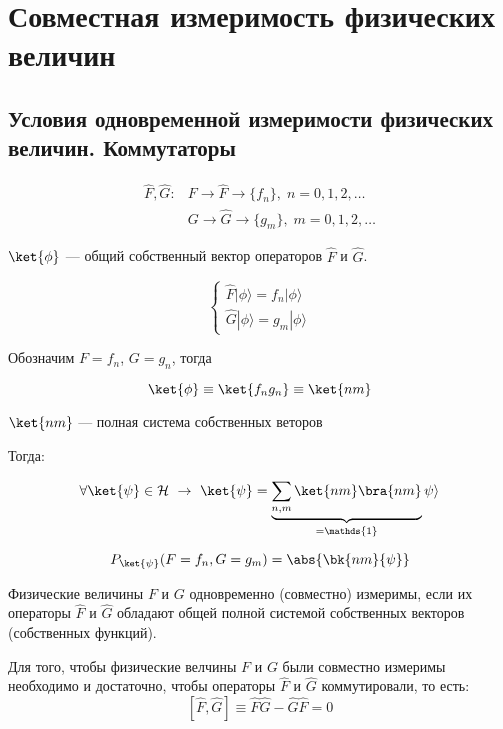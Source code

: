 \chapter{Совместная измеримость физических величин}

\section{Условия одновременной измеримости физических величин. Коммутаторы}

$$
\begin{array}{lcl}
\widehat{F}, \widehat{G}:  & F \rightarrow \widehat{F} \rightarrow \{f_n\}, \; n=0,1,2,\dots\\
                           & G \rightarrow \widehat{G} \rightarrow \{g_m\}, \; m=0,1,2,\dots
\end{array}
$$

$\ket{\phi}$ --- общий собственный вектор операторов $\widehat{F}$ и $\widehat{G}$.

\begin{equation}
\label{eq:4_1_1}
\begin{cases}
\widehat{F} |\phi \rangle = f_n |\phi \rangle\\
\widehat{G} |\phi \rangle = g_m |\phi \rangle
\end{cases} 
\end{equation}

Обозначим $F = f_n$, $G=g_n$, тогда

$$\ket{\phi} \equiv \ket{f_n g_n} \equiv \ket{nm}$$

$\ket{nm}$ --- полная система собственных веторов

Тогда:

\begin{equation}
\label{eq:4_1_2}
\forall \ket{\psi} \in \mathcal{H} ~\rightarrow ~ \ket{\psi} = \underbrace{\sum_{n,m}\ket{nm}\bra{nm}}_{=\mathds{1}} \psi \rangle 
\end{equation}

$$P_{\ket{\psi}}(F = f_n, G = g_m) = \abs{\bk{nm}{\psi}}$$

\begin{defn}
Физические величины $F$ и $G$ одновременно (совместно) измеримы, если их операторы $\widehat{F}$ и $\widehat{G}$ обладают общей полной системой собственных векторов (собственных функций).
\end{defn}

\begin{thm}

Для того, чтобы физические велчины $F$ и $G$ были совместно измеримы необходимо и достаточно, чтобы операторы $\widehat{F}$ и $\widehat{G}$ коммутировали, то есть: 
$$[\widehat{F}, \widehat{G}] \equiv \widehat{F}\widehat{G} - \widehat{G}\widehat{F} = 0$$
\end{thm}


